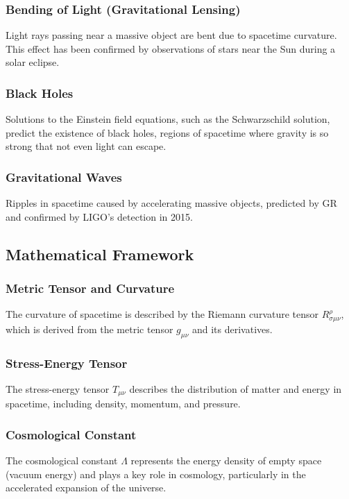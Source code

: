 \subsubsection{Bending of Light (Gravitational Lensing)}
Light rays passing near a massive object are bent due to spacetime curvature. This effect has been confirmed by observations of stars near the Sun during a solar eclipse.

\subsubsection{Black Holes}
Solutions to the Einstein field equations, such as the Schwarzschild solution, predict the existence of black holes, regions of spacetime where gravity is so strong that not even light can escape.

\subsubsection{Gravitational Waves}
Ripples in spacetime caused by accelerating massive objects, predicted by GR and confirmed by LIGO's detection in 2015.

\subsection{Mathematical Framework}

\subsubsection{Metric Tensor and Curvature}
The curvature of spacetime is described by the Riemann curvature tensor $R^{\rho}_{\sigma \mu \nu}$, which is derived from the metric tensor $g_{\mu \nu}$ and its derivatives.

\subsubsection{Stress-Energy Tensor}
The stress-energy tensor $T_{\mu \nu}$ describes the distribution of matter and energy in spacetime, including density, momentum, and pressure.

\subsubsection{Cosmological Constant}
The cosmological constant $\Lambda$ represents the energy density of empty space (vacuum energy) and plays a key role in cosmology, particularly in the accelerated expansion of the universe.

